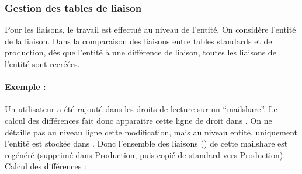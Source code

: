 \subsubsection*{Gestion des tables de liaison}

Pour les liaisons, le travail est effectué au niveau de l'entité.
On considère l'entité de la liaison. Dans la comparaison des liaisons entre tables standards et de production, dès que l'entité à une différence de liaison, toutes les liaisons de l'entité sont recréées.

\paragraph{Exemple :} Un utilisateur a été rajouté dans les droits de lecture sur un ``mailshare''. Le calcul des différences fait donc apparaitre cette ligne de droit dans . On ne détaille pas au niveau ligne cette modification, mais au niveau entité, uniquement l'entité est stockée dans . Donc l'ensemble des liaisons () de cette mailshare est regénéré (supprimé dans Production, puis copié de standard vers Production).\\

Calcul des différences : \\

